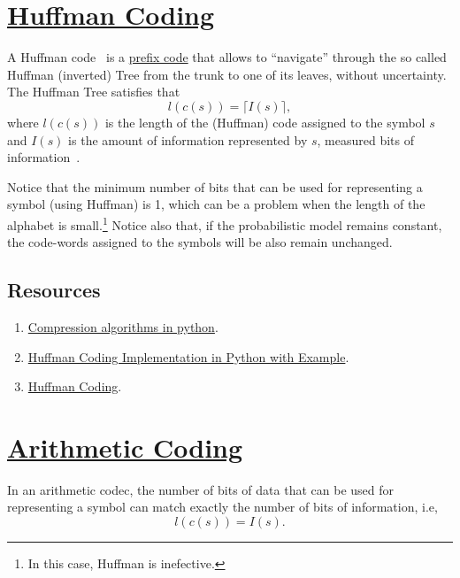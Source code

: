 \section{\href{https://en.wikipedia.org/wiki/Huffman_coding}{Huffman Coding}}

A Huffman code~\cite{vruiz__huffman_coding} is a
\href{https://en.wikipedia.org/wiki/Prefix_code}{prefix code} that
allows to ``navigate'' through the so called Huffman (inverted) Tree
from the trunk to one of its leaves, without
uncertainty. The Huffman Tree satisfies that
\begin{equation}
  l(c(s)) = \lceil I(s)\rceil,
  \label{eq:huffman_performance}
\end{equation}
where $l(c(s))$ is the length of the (Huffman) code assigned to the
symbol $s$ and $I(s)$ is the amount of information represented by $s$,
measured bits of information~\cite{vruiz__information_theory}.

Notice that the minimum number of bits that can be used for
representing a symbol (using Huffman) is 1, which can be a problem
when the length of the alphabet is small.\footnote{In this case,
  Huffman is inefective.} Notice also that, if the probabilistic model
remains constant, the code-words assigned to the symbols will be also
remain unchanged.

\subsection*{Resources}
\begin{enumerate}
\item \href{https://www.inference.org.uk/mackay/python/compress/#Huff}{Compression algorithms in python}.
\item \href{https://favtutor.com/blogs/huffman-coding}{Huffman Coding Implementation in Python with Example}.
\item \href{https://www.programiz.com/dsa/huffman-coding}{Huffman Coding}.
\end{enumerate}

\section{\href{https://en.wikipedia.org/wiki/Arithmetic_coding}{Arithmetic
    Coding}~\cite{vruiz__arithmetic_coding}}

In an arithmetic codec, the number of bits of data that can be used for
representing a symbol can match exactly the number of bits of
information, i.e,
\begin{equation}
  l(c(s)) = I(s).
\end{equation}


